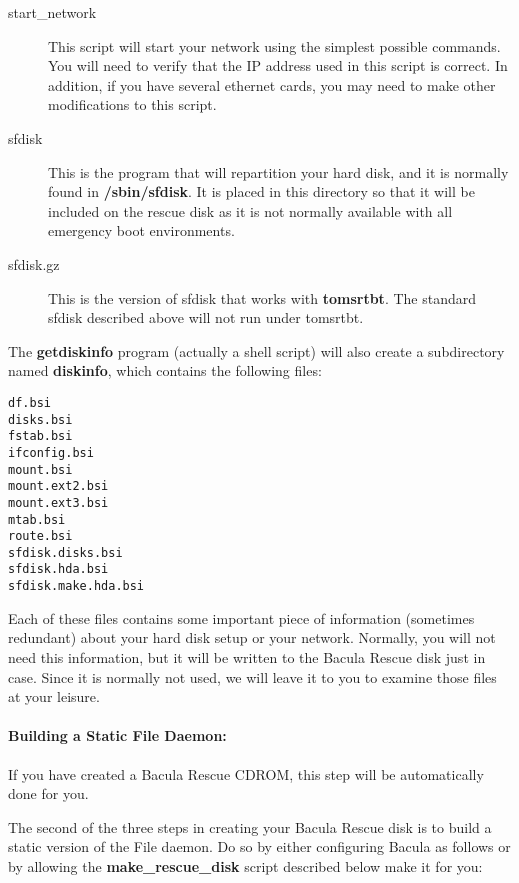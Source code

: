 \begin{description}
\item [start\_network]
   This script will start your network using  the simplest possible commands. You
will need to verify that the  IP address used in this script is correct. In
addition, if you  have several ethernet cards, you may need to make other
modifications  to this script.  

\item [sfdisk]
   This is the program that will repartition your hard disk,  and it is normally
found in {\bf /sbin/sfdisk}. It is placed in  this directory so that it will
be included on the rescue disk as  it is not normally available with all
emergency boot environments.  

\item [sfdisk.gz]
   This is the version of sfdisk that works with  {\bf tomsrtbt}. The standard
sfdisk described above will not  run under tomsrtbt. 
\end{description}

The {\bf getdiskinfo} program (actually a shell script) will also create a
subdirectory named {\bf diskinfo}, which contains the following files: 

\footnotesize
\begin{verbatim}
df.bsi
disks.bsi
fstab.bsi
ifconfig.bsi
mount.bsi
mount.ext2.bsi
mount.ext3.bsi
mtab.bsi
route.bsi
sfdisk.disks.bsi
sfdisk.hda.bsi
sfdisk.make.hda.bsi
\end{verbatim}
\normalsize

Each of these files contains some important piece of information (sometimes
redundant) about your hard disk setup or your network. Normally, you will not
need this information, but it will be written to the Bacula Rescue disk just
in case. Since it is normally not used, we will leave it to you to examine
those files at your leisure. 

\paragraph*{Building a Static File Daemon:}

If you have created a Bacula Rescue CDROM, this step will be automatically
done for you. 

The second of the three steps in creating your Bacula Rescue disk is to build
a static version of the File daemon. Do so by either configuring Bacula as
follows or by allowing the {\bf make\_rescue\_disk} script described below
make it for you: 


